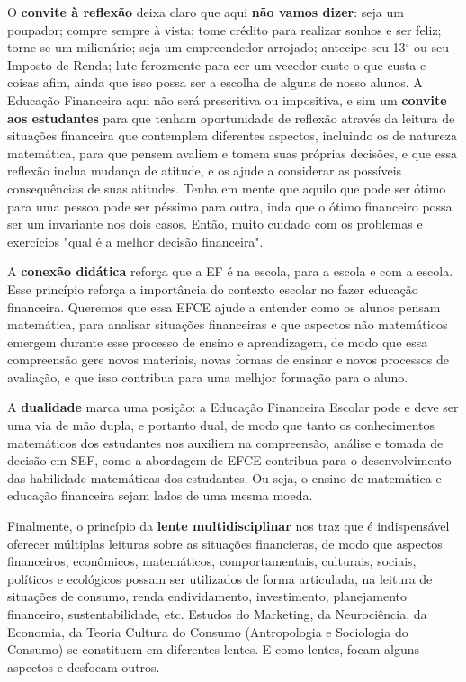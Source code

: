 \begin{paginatexto}
O \textbf{convite à reflexão} deixa claro que aqui \textbf{não vamos dizer}: seja um poupador; compre sempre à vista; tome crédito para realizar sonhos e ser feliz; torne-se um milionário; seja um empreendedor arrojado; antecipe seu 13$^{\circ}$ ou seu Imposto de Renda; lute ferozmente para cer um vecedor custe o que custa e coisas afim, ainda que isso possa ser a escolha de alguns de nosso alunos. A Educação Financeira aqui não será prescritiva ou impositiva, e sim um \textbf{convite aos estudantes} para que tenham oportunidade de reflexão através da leitura de situações financeira que contemplem diferentes aspectos, incluindo os de natureza matemática, para que pensem avaliem e tomem suas próprias decisões, e que essa reflexão inclua mudança de atitude, e os ajude a considerar as possíveis consequências de suas atitudes. Tenha em mente que aquilo que pode ser ótimo para uma pessoa pode ser péssimo para outra, inda que o ótimo financeiro possa ser um invariante nos dois casos. Então, muito cuidado com os problemas e exercícios "qual é a melhor decisão financeira".

A \textbf{conexão didática} reforça que a EF é na escola, para a escola e com a escola. Esse princípio reforça a importância do contexto escolar no fazer educação financeira. Queremos que essa EFCE ajude a entender como os alunos pensam matemática, para analisar situações financeiras e que aspectos não matemáticos emergem durante esse processo de ensino e aprendizagem, de modo que essa compreensão gere novos materiais, novas formas de ensinar e novos processos de avaliação, e que isso contribua para uma melhjor formação para o aluno.

A \textbf{dualidade} marca uma posição: a Educação Financeira Escolar pode e deve ser uma via de mão dupla, e portanto dual, de modo que tanto os conhecimentos matemáticos dos estudantes nos auxiliem na compreensão, análise e tomada de decisão em SEF, como a abordagem de EFCE contribua para o desenvolvimento das habilidade matemáticas dos estudantes. Ou seja, o ensino de matemática e educação financeira sejam lados de uma mesma moeda.

Finalmente, o princípio da \textbf{lente multidisciplinar} nos traz que é indispensável oferecer múltiplas leituras sobre as situações financieras, de modo que aspectos financeiros, econômicos, matemáticos, comportamentais, culturais, sociais, políticos e ecológicos possam ser utilizados de forma articulada, na leitura de situações de consumo, renda endividamento, investimento, planejamento financeiro, sustentabilidade, etc. Estudos do Marketing, da Neurociência, da Economia, da Teoria Cultura do Consumo (Antropologia e Sociologia do Consumo) se constituem em diferentes lentes. E como lentes, focam alguns aspectos e desfocam outros.


\end{paginatexto}

